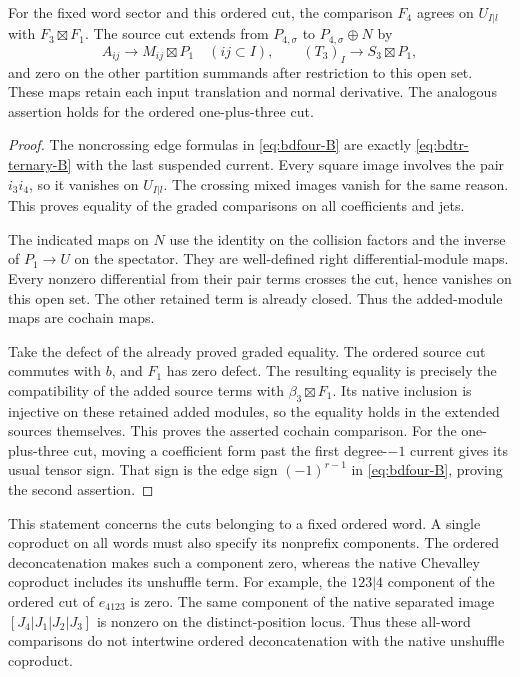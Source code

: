 \begin{proposition}\label{prop:bdfour-ternary-cut}
For the fixed word sector and this ordered cut, the comparison $F_4$ agrees on $U_{I|l}$ with $F_3\boxtimes F_1$.
The source cut extends from $P_{4,\sigma}$ to $P_{4,\sigma}\oplus N$ by
\[
 A_{ij}\longrightarrow M_{ij}\boxtimes P_1\quad(ij\subset I),
 \qquad (T_3)_I\longrightarrow S_3\boxtimes P_1,
\]
and zero on the other partition summands after restriction to this open set.
These maps retain each input translation and normal derivative.
The analogous assertion holds for the ordered one-plus-three cut.
\end{proposition}
\begin{proof}
The noncrossing edge formulas in \eqref{eq:bdfour-B} are exactly \eqref{eq:bdtr-ternary-B} with the last suspended current.
Every square image involves the pair $i_3i_4$, so it vanishes on $U_{I|l}$.
The crossing mixed images vanish for the same reason.
This proves equality of the graded comparisons on all coefficients and jets.

The indicated maps on $N$ use the identity on the collision factors and the inverse of $P_1\to U$ on the spectator.
They are well-defined right differential-module maps.
Every nonzero differential from their pair terms crosses the cut, hence vanishes on this open set.
The other retained term is already closed.
Thus the added-module maps are cochain maps.

Take the defect of the already proved graded equality.
The ordered source cut commutes with $b$, and $F_1$ has zero defect.
The resulting equality is precisely the compatibility of the added source terms with $\beta_3\boxtimes F_1$.
Its native inclusion is injective on these retained added modules, so the equality holds in the extended sources themselves.
This proves the asserted cochain comparison.
For the one-plus-three cut, moving a coefficient form past the first degree-$-1$ current gives its usual tensor sign.
That sign is the edge sign $(-1)^{r-1}$ in \eqref{eq:bdfour-B}, proving the second assertion.
\end{proof}

This statement concerns the cuts belonging to a fixed ordered word.
A single coproduct on all words must also specify its nonprefix components.
The ordered deconcatenation makes such a component zero, whereas the native Chevalley coproduct includes its unshuffle term.
For example, the $123|4$ component of the ordered cut of $e_{4123}$ is zero.
The same component of the native separated image $[J_4|J_1|J_2|J_3]$ is nonzero on the distinct-position locus.
Thus these all-word comparisons do not intertwine ordered deconcatenation with the native unshuffle coproduct.

